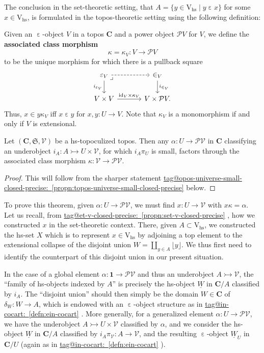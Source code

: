 \documentclass{amsart}
\makeatletter
\newcommand\bC{\mathbf{C}}
\newcommand\cV{\mathcal{V}}
\newcommand\defword[1]{{\boldmath \textbf{#1}}}
\newcommand\ein{\mathrel{\varepsilon}}
\newcommand\floor[2][]{#1\lfloor #2 #1\rfloor}
\newcommand\fS{\mathfrak{S}}
\newcommand\hs{\mathrm{hs}}
\newcommand\id{\mathrm{id}}
\newcommand\pb[1][rd]{\ar[#1, phantom, "\lrcorner", pos=0]}
\newcommand\pow{\mathcal{P}}
\newcommand\rV{\mathrm{V}}
\newcommand\set[2][]{#1\{ #2 #1\}}
\newcommand\tm{\mathbf{1}}
\newcommand\tto{\rightarrowtail}
\newcommand\und[1]{\underline{#1}}
\newcommand\unein{{\ein}}
\newcommand\tagword[1]{\csname tag@#1\endcsname}
\def\label@tag#1:#2\@nil{#1}
\newcommand\labeltag[1]{\label@tag#1:\@nil}
\newcommand\jref[1]{%
  \texorpdfstring%
    {\hyperref[#1]{\tagword{\labeltag{#1}}~\ref*{#1}}}%
    {\tagword{\labeltag{#1}}~\ref*{#1}}%
}
\theoremstyle{definition}
\theoremstyle{remark}
\theoremstyle{plainwithref}
\makeatother
\begin{document}
The conclusion in the set-theoretic setting, that \( A = \set{y \in \rV_\hs \mid y \ein x} \) for some \( x \in \rV_\hs \), is formulated in the topos-theoretic setting using the following definition:
\begin{defn} \label{defn:associated-class}
  Given an \( \unein \)-object \( V \) in a topos \( \bC \) and a power object \( \pow V \) for \( V \), we define the \defword{associated class morphism}
  \[
    \kappa = \kappa_V \colon V \to \pow V
  \]
  to be the unique morphism for which there is a pullback square
  \[
    \begin{tikzcd}
      \ein_V \ar[r, dashed] \ar[d, "i_{\ein_V}"'] \pb &[10pt] \in_V \ar[d, "i_{\in_V}"] \\
      V \times V \ar[r, "\id_V \times \kappa_V"] & V \times \pow V.
    \end{tikzcd}
  \]
  Thus, \( x \in y \kappa_V \) iff \( x \ein y \) for \( x,y \colon U \to V \).
  Note that \( \kappa_V \) is a monomorphism if and only if \( V \) is extensional.
\end{defn}

\begin{thm} \label{thm:topos-universe-small-closed}
  Let \( (\bC, \fS, \cV) \) be a hs-topoculized topos.
  Then any \( \alpha \colon U \to \pow \cV \) in \( \bC \) classifying an underobject \( i_A \colon A \tto U \times \cV \), for which \( i_A \pi_U \) is small, factors through the associated class morphism \( \kappa \colon \cV \to \pow \cV \).
\end{thm}
\begin{proof}
  This will follow from the sharper statement \jref{propn:topos-universe-small-closed-precise} below.
\end{proof}

To prove this theorem, given \( \alpha \colon U \to \pow \cV \), we must find \( x \colon U \to \cV \) with \( x \kappa = \alpha \).
Let us recall, from \jref{propn:set-v-closed-precise}, how we constructed \( x \) in the set-theoretic context.
There, given \( A \subset \rV_\hs \), we constructed the hs-set \( X \) which is to represent \( x \in \rV_\hs \) by adjoining a top element to the extensional collapse of the disjoint union \( W = \coprod_{y \in A} \floor{y} \).
We thus first need to identify the counterpart of this disjoint union in our present situation.

In the case of a global element \( \alpha \colon \tm \to \pow \cV \) and thus an underobject \( A \tto \cV \), the ``family of hs-objects indexed by \( A \)'' is precisely the hs-object \( \und W \) in \( \bC / A \) classified by \( i_A \).
The ``disjoint union'' should then simply be the domain \( W \in \bC \) of \( \delta_W \colon W \to A \), which is endowed with an \( \unein \)-object structure as in \jref{defn:ein-cocart}.
More generally, for a generalized element \( \alpha \colon U \to \pow \cV \), we have the underobject \( A \tto U \times \cV \) classified by \( \alpha \), and we consider the hs-object \( \und W \) in \( \bC / A \) classified by \( i_A \pi_{\cV} \colon A \to \cV \), and the resulting \( \unein \)-object \( \und W_U \) in \( \bC / U \) (again as in \jref{defn:ein-cocart}).
\end{document}
